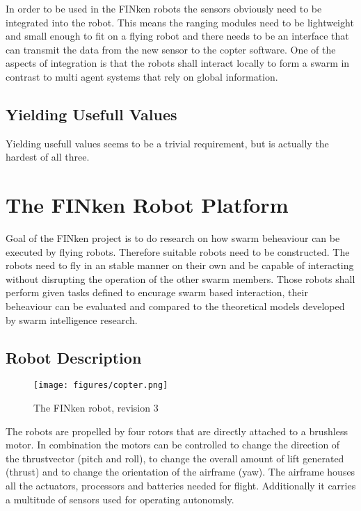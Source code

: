 In order to be used in the FINken robots the sensors obviously need to be integrated into the robot.
This means the ranging modules need to be lightweight and small enough to fit on a flying robot and there needs to be an interface that can transmit the data from the new sensor to the copter software.
One of the aspects of integration is that the robots shall interact locally to form a swarm in contrast to multi agent systems that rely on global information.

\subsection{Yielding Usefull Values}
Yielding usefull values seems to be a trivial requirement, but is actually the hardest of all three.


\section{The FINken Robot Platform}

Goal of the FINken project is to do research on how swarm beheaviour can be executed by flying robots.
Therefore suitable robots need to be constructed.
The robots need to fly in an stable manner on their own and be capable of interacting without disrupting the operation of the other swarm members.
Those robots shall perform given tasks defined to encurage swarm based interaction, their beheaviour can be evaluated and compared to the theoretical models developed by swarm intelligence research.

\subsection{Robot Description}
\begin{figure}[H]
	\centering
\texttt{[image: figures/copter.png]}
\label{copterfoto}
\caption{The FINken robot, revision 3}
\end{figure}

The robots are propelled by four rotors that are directly attached to a brushless motor.
In combination the motors can be controlled to change the direction of the thrustvector (pitch and roll), to change the overall amount of lift generated (thrust) and to change the orientation of the airframe (yaw).
The airframe houses all the actuators, processors and batteries needed for flight.
Additionally it carries a multitude of sensors used for operating autonomsly.


